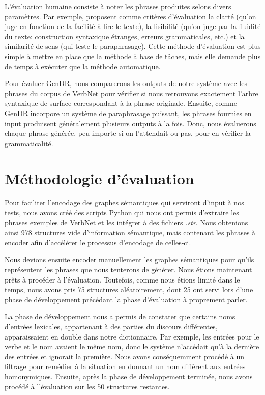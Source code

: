 L'évaluation humaine consiste à noter les phrases produites selons divers paramètres. Par exemple, \cite{BelzFirstSurfaceRealisation2011} proposent comme critères d'évaluation la clarté (qu'on juge en fonction de la facilité à lire le texte), la lisibilité (qu'on juge par la fluidité du texte: construction syntaxique étranges, erreurs grammaticales, etc.) et la similarité de sens (qui teste le paraphrasage). Cette méthode d'évaluation est plus simple à mettre en place que la méthode à base de tâches, mais elle demande plus de temps à exécuter que la méthode automatique.

Pour évaluer GenDR, nous comparerons les outputs de notre système avec les phrases du corpus de VerbNet pour vérifier si nous retrouvons exactement l'arbre syntaxique de surface correspondant à la phrase originale. Ensuite, comme GenDR incorpore un système de paraphrasage puissant, les phrases fournies en input produisent généralement plusieurs outputs à la fois. Donc, nous évaluerons chaque phrase générée, peu importe si on l'attendait ou pas, pour en vérifier la grammaticalité.

\section{Méthodologie d'évaluation}

Pour faciliter l'encodage des graphes sémantiques qui serviront d'input à nos tests, nous avons créé des scripts Python qui nous ont permis d'extraire les phrases exemples de VerbNet et les intégrer à des fichiers \emph{.str}. Nous obtenions ainsi 978 structures vide d'information sémantique, mais contenant les phrases à encoder afin d'accélérer le processus d'encodage de celles-ci.

Nous devions ensuite encoder manuellement les graphes sémantiques pour qu'ils représentent les phrases que nous tenterons de générer. Nous étions maintenant prêts à procéder à l'évaluation. Toutefois, comme nous étions limité dans le temps, nous avons pris 75 structures aléatoirement, dont 25 ont servi lors d'une phase de développement précédant la phase d'évaluation à proprement parler.

La phase de développement nous a permis de constater que certains noms d'entrées lexicales, appartenant à des parties du discours différentes, apparaissaient en double dans notre dictionnaire. Par exemple, les entrées pour le verbe  et le nom  avaient le même nom, donc le système n'accédait qu'à la dernière des entrées et ignorait la première. Nous avons conséquemment procédé à un filtrage pour remédier à la situation en donnant un nom différent aux entrées homonymiques. Ensuite, après la phase de développement terminée, nous avons procédé à l'évaluation sur les 50 structures restantes.
                              
